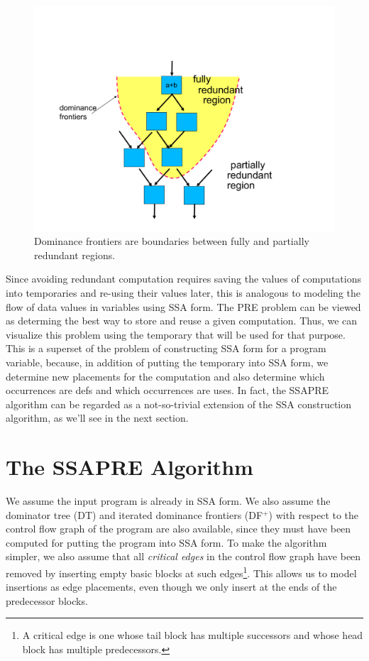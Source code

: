 \begin{figure}
\centering
\includegraphics[scale=0.35]{fig-ssapre-motive.pdf}
\caption{Dominance frontiers are boundaries between fully and partially redundant regions.}
\label{fig: ssapre-motive}
\end{figure}

Since avoiding redundant computation requires saving the values of 
computations into temporaries and re-using their values later, this is
analogous to modeling the flow of data values in variables using SSA form.
The PRE problem can be viewed as determing the best way to store and
reuse a given computation.  Thus, we can visualize this problem using
the temporary that will be used for that purpose.  This is a superset of
the problem of constructing SSA form for a program variable, because,
in addition of putting the temporary into SSA form, 
we determine new placements for the computation and also determine
which occurrences are defs and which occurrences are uses.  In fact, the
SSAPRE algorithm can be regarded as a not-so-trivial extension of the SSA 
construction algorithm, as we'll see in the next section.

\section{The SSAPRE Algorithm}

We assume the input program is already in SSA form.  We also assume 
the dominator tree (DT) and iterated dominance frontiers (DF$^+$) with
respect to the control flow graph of the program are also available, since
they must have been computed for putting the program into SSA form.
To make the algorithm simpler, we also assume that all \emph{critical edges}
in the control flow graph have been removed by inserting empty basic blocks
at such edges\footnote{A critical edge is one whose tail block has multiple
successors and whose head block has multiple predecessors.}\cite{Rosen88}.
This allows us to model insertions as edge placements, even though we only
insert at the ends of the predecessor blocks.

